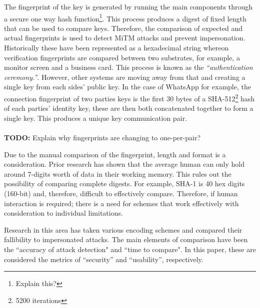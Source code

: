 The fingerprint of the key is generated by running the main components through a secure one way hash function\footnote{Explain this?}. This process produces a digest of fixed length that can be used to compare keys. Therefore, the comparison of expected and actual fingerprints is used to detect MiTM attacks and prevent impersonation.
Historically these have been represented as a hexadecimal string whereon verification fingerprints are compared between two substrates, for example, a monitor screen and a business card.
This process is known as the \textit{``authentication ceremony.''}. However, other systems are moving away from that and creating a single key from each sides' public key. In the case of WhatsApp for example, the connection fingerprint of two parties keys is the first 30 bytes of a SHA-512\footnote{5200 iterations} hash of each parties' identity key, these are then both concatenated together to form a single key\cite{whatsapp2017paper}. This produces a unique key communication pair.
\\\\
\textbf{TODO:} Explain why fingerprints are changing to one-per-pair?

Due to the manual comparison of the fingerprint, length and format is a consideration. Prior research has shown that the average human can only hold around 7-digits worth of data in their working memory\cite{miller1956magical}. This rules out the possibility of comparing complete digests. For example, SHA-1 is 40 hex digits (160-bit) and, therefore, difficult to effectively compare. Therefore, if human interaction is required; there is a need for schemes that work effectively with consideration to individual limitations.

Research in this area has taken various encoding schemes and compared their fallibility to impersonated attacks. The main elements of comparison have been the ``accuracy of attack detection" and ``time to compare". In this paper, these are considered the metrics of ``security'' and ``usability'', respectively.

